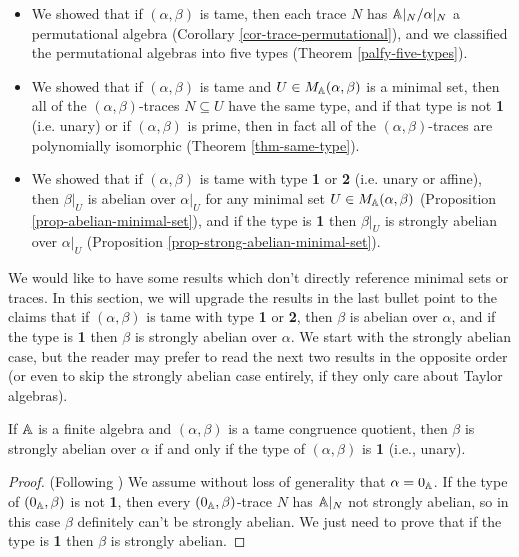 \begin{appendices}
\begin{itemize}
\item We showed that if $(\alpha, \beta)$ is tame, then each trace $N$ has $\mathbb{A}|_N / \alpha|_N$ a permutational algebra (Corollary \ref{cor-trace-permutational}), and we classified the permutational algebras into five types (Theorem \ref{palfy-five-types}).

\item We showed that if $(\alpha, \beta)$ is tame and $U \in M_{\mathbb{A}}(\alpha, \beta)$ is a minimal set, then all of the $(\alpha,\beta)$-traces $N \subseteq U$ have the same type, and if that type is not \textbf{1} (i.e. unary) or if $(\alpha, \beta)$ is prime, then in fact all of the $(\alpha, \beta)$-traces are polynomially isomorphic (Theorem \ref{thm-same-type}).

\item We showed that if $(\alpha, \beta)$ is tame with type \textbf{1} or \textbf{2} (i.e. unary or affine), then $\beta|_U$ is abelian over $\alpha|_U$ for any minimal set $U \in M_{\mathbb{A}}(\alpha, \beta)$ (Proposition \ref{prop-abelian-minimal-set}), and if the type is \textbf{1} then $\beta|_U$ is strongly abelian over $\alpha|_U$ (Proposition \ref{prop-strong-abelian-minimal-set}).
\end{itemize}

We would like to have some results which don't directly reference minimal sets or traces. In this section, we will upgrade the results in the last bullet point to the claims that if $(\alpha, \beta)$ is tame with type \textbf{1} or \textbf{2}, then $\beta$ is abelian over $\alpha$, and if the type is \textbf{1} then $\beta$ is strongly abelian over $\alpha$. We start with the strongly abelian case, but the reader may prefer to read the next two results in the opposite order (or even to skip the strongly abelian case entirely, if they only care about Taylor algebras).

\begin{thm}\label{type-strong-abelian} If $\mathbb{A}$ is a finite algebra and $(\alpha, \beta)$ is a tame congruence quotient, then $\beta$ is strongly abelian over $\alpha$ if and only if the type of $(\alpha, \beta)$ is \textbf{1} (i.e., unary).
\end{thm}
\begin{proof} (Following \cite{hobby-mckenzie}) We assume without loss of generality that $\alpha = 0_{\mathbb{A}}$. If the type of $(0_{\mathbb{A}}, \beta)$ is not \textbf{1}, then every $(0_{\mathbb{A}},\beta)$-trace $N$ has $\mathbb{A}|_N$ not strongly abelian, so in this case $\beta$ definitely can't be strongly abelian. We just need to prove that if the type is \textbf{1} then $\beta$ is strongly abelian.


\end{proof}
\end{appendices}
